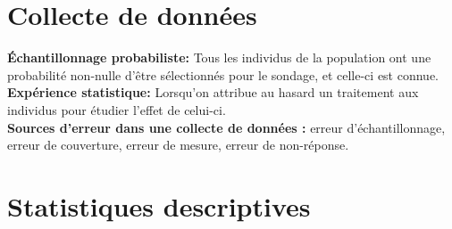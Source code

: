 \documentclass[12pt,french]{article}
\begin{document}
\section*{Collecte de données}


\textbf{Échantillonnage probabiliste:} Tous les individus de la population ont une probabilité non-nulle d'être sélectionnés pour le sondage, et celle-ci est connue. \\

\textbf{Expérience statistique:} Lorsqu'on attribue au hasard un traitement aux individus pour étudier l'effet de celui-ci. \\

\textbf{Sources d'erreur dans une collecte de données :} erreur d'échantillonnage, erreur de couverture, erreur de mesure, erreur de non-réponse.


\section*{Statistiques descriptives}
\end{document}
